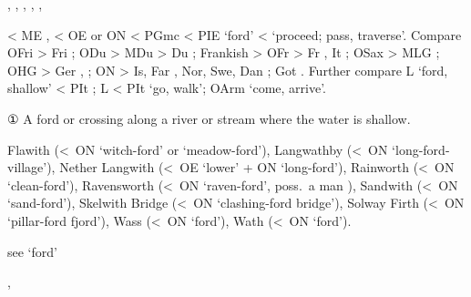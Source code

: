 \documentclass[12pt,letterpaper,oneside,article,draft]{memoir}
\begin{document}
\begin{Lemma}
\begin{Also}
	, , , , , 
\end{Also}
\begin{Etymology}
	< ME ,  < OE  or ON  < PGmc 
		< PIE  ‘ford’ <  ‘proceed; pass, traverse’.
	Compare OFri  > Fri ;  
		ODu  > MDu  > Du ;
		Frankish  > OFr  > Fr , It ;
		OSax  > MLG ;
		OHG  > Ger , ;
		ON  > Is, Far , Nor, Swe, Dan ;
		Got  .
	Further compare L  ‘ford, shallow’ < PIt ;
		L  < PIt  ‘go, walk’;
		OArm   ‘come, arrive’.
\end{Etymology}
\begin{Definitions}
	① A ford or crossing along a river or stream where the water is shallow.
\end{Definitions}
\begin{Examples}
	Flawith (<~ON  ‘witch-ford’ or  ‘meadow-ford’),
	Langwathby (<~ON  ‘long-ford-village’),
	Nether Langwith (<~OE  ‘lower’ + ON  ‘long-ford’),
	Rainworth (<~ON  ‘clean-ford’),
	Ravensworth (<~ON  ‘raven-ford’, poss.\ a man ),
	Sandwith (<~ON  ‘sand-ford’),
	Skelwith Bridge (<~ON   ‘clashing-ford bridge’),
	Solway Firth (<~ON   ‘pillar-ford fjord’),
	Wass (<~ON  ‘ford’),
	Wath (<~ON  ‘ford’).
\end{Examples}
\end{Lemma}

\begin{Lemma}
\begin{Also}
\end{Also}
\end{Lemma}

\begin{Lemma}
 see  ‘ford’
\end{Lemma}

\begin{Lemma}
\begin{Also}
	, 
\end{Also}
\end{Lemma}
\end{document}
